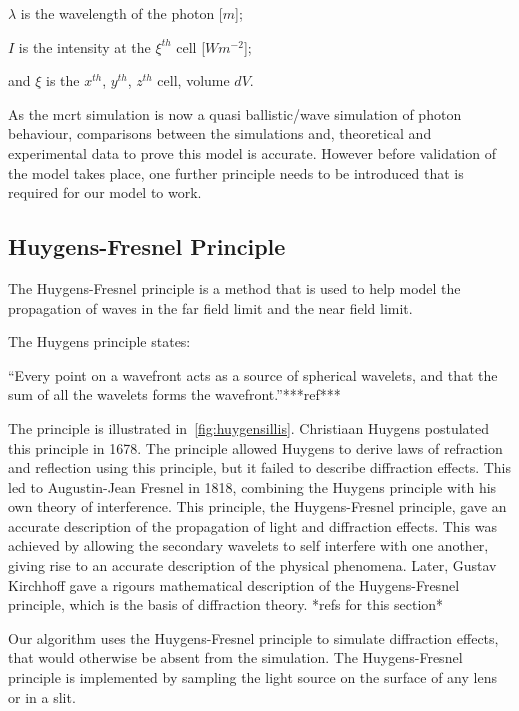 \indent $\lambda$ is the wavelength of the photon [$m$];

\indent $I$ is the intensity at the $\xi^{th}$ cell [$W m^{-2}$];

\indent and $\xi$ is the $x^{th}$, $y^{th}$, $z^{th}$ cell, volume $dV$.

\medskip

As the \gls*{mcrt} simulation is now a quasi ballistic/wave simulation of photon behaviour, comparisons between the simulations and, theoretical and experimental data to prove this model is accurate. However before validation of the model takes place, one further principle needs to be introduced that is required for our model to work.

\subsection{Huygens-Fresnel Principle}

The Huygens-Fresnel principle is a method that is used to help model the propagation of waves in the far field limit and the near field limit. 

The Huygens principle states: 

\medskip

``Every point on a wavefront acts as a source of spherical wavelets, and that the sum of all the wavelets forms the wavefront.''***ref***

\medskip

The principle is illustrated in~\cref{fig:huygensillis}. Christiaan Huygens postulated this principle in 1678.
The principle allowed Huygens to derive laws of refraction and reflection using this principle, but it failed to describe diffraction effects.
This led to Augustin-Jean Fresnel in 1818, combining the Huygens principle with his own theory of interference.
This principle, the Huygens-Fresnel principle, gave an accurate description of the propagation of light and diffraction effects.
This was achieved by allowing the secondary wavelets to self interfere with one another, giving rise to an accurate description of the physical phenomena.
Later, Gustav Kirchhoff gave a rigours mathematical description of the Huygens-Fresnel principle, which is the basis of diffraction theory. *refs for this section*

Our algorithm uses the Huygens-Fresnel principle to simulate diffraction effects, that would otherwise be absent from the simulation.
The Huygens-Fresnel principle is implemented by sampling the light source on the surface of any lens or in a slit.





